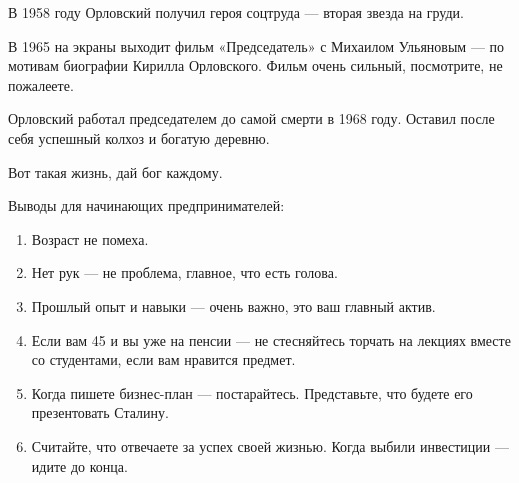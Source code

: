 В 1958 году Орловский получил героя соцтруда — вторая звезда на груди.

В 1965 на экраны выходит фильм «Председатель» с Михаилом Ульяновым — по мотивам биографии Кирилла Орловского. Фильм очень сильный, посмотрите, не пожалеете.

Орловский работал председателем до самой смерти в 1968 году.
Оставил после себя успешный колхоз и богатую деревню.

Вот такая жизнь, дай бог каждому.

Выводы для начинающих предпринимателей:
\begin{enumerate}
	\item  Возраст не помеха.
\item  Нет рук — не проблема, главное, что есть голова.
\item  Прошлый опыт и навыки — очень важно, это ваш главный актив.
\item  Если вам 45 и вы уже на пенсии — не стесняйтесь торчать на лекциях вместе со студентами, если вам нравится предмет.
\item  Когда пишете бизнес-план — постарайтесь. Представьте, что будете его презентовать Сталину.
\item  Считайте, что отвечаете за успех своей жизнью. Когда выбили инвестиции — идите до конца.
\end{enumerate}

